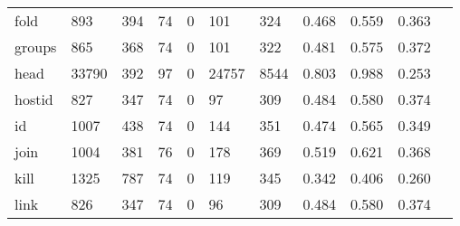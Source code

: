 \begin{longtable}{lp{1.10cm}p{1.10cm}p{1.10cm}p{1.10cm}p{1.10cm}p{1.10cm}p{1.10cm}p{1.10cm}p{1.10cm}p{1.10cm}}
fold      &                    893 &                                394 &                                74 &                                0 &                               101 &                             324 &                             0.468 &                                 0.559 &                               0.363 \\
groups    &                    865 &                                368 &                                74 &                                0 &                               101 &                             322 &                             0.481 &                                 0.575 &                               0.372 \\
head      &                  33790 &                                392 &                                97 &                                0 &                             24757 &                            8544 &                             0.803 &                                 0.988 &                               0.253 \\
hostid    &                    827 &                                347 &                                74 &                                0 &                                97 &                             309 &                             0.484 &                                 0.580 &                               0.374 \\
id        &                   1007 &                                438 &                                74 &                                0 &                               144 &                             351 &                             0.474 &                                 0.565 &                               0.349 \\
join      &                   1004 &                                381 &                                76 &                                0 &                               178 &                             369 &                             0.519 &                                 0.621 &                               0.368 \\
kill      &                   1325 &                                787 &                                74 &                                0 &                               119 &                             345 &                             0.342 &                                 0.406 &                               0.260 \\
link      &                    826 &                                347 &                                74 &                                0 &                                96 &                             309 &                             0.484 &                                 0.580 &                               0.374 \\

\end{longtable}
